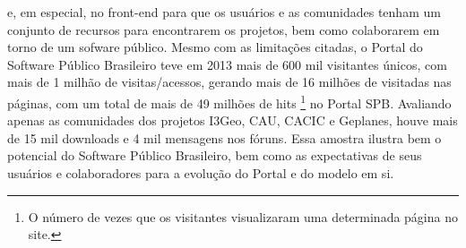 e, em especial, no front-end \footnotemark[2] para que os usuários e as comunidades
tenham um conjunto de recursos para encontrarem os projetos, bem como colaborarem em torno 
de um sofware público.
%
Mesmo com as limitações citadas, o Portal do Software Público Brasileiro teve em 2013 
mais de 600 mil visitantes únicos, com mais de 1 milhão de visitas/acessos, gerando mais
de 16 milhões de visitadas nas páginas, com um total de mais de 49 milhões de hits \footnote{O número de vezes que os visitantes visualizaram uma determinada página no site.} no
Portal SPB. Avaliando apenas as comunidades dos projetos I3Geo, CAU, CACIC e Geplanes,
houve mais de 15 mil downloads e 4 mil mensagens nos fóruns. Essa amostra
ilustra bem o potencial do Software Público Brasileiro, bem como as expectativas de seus
usuários e colaboradores para a evolução do Portal e do modelo em si.